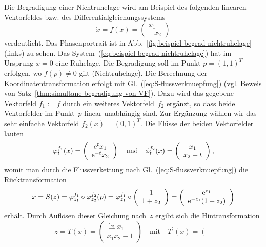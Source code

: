 \begin{example}
Die Begradigung einer Nichtruhelage wird am Beispiel des folgenden
linearen Vektorfeldes bzw. des Differentialgleichungssystems 
\begin{equation}
\dot{x}=f(x)=\left(\begin{array}{r}
x_{1}\\
-x_{2}
\end{array}\right)\label{eq:beispiel-begrad-nichtruhelage}
\end{equation}
verdeutlicht. Das Phasenportrait ist in Abb.~\ref{fig:beispiel-begrad-nichtruhelage}
(links) zu sehen. Das System~(\ref{eq:beispiel-begrad-nichtruhelage})
hat im Ursprung $x=0$ eine Ruhelage. Die Begradigung soll im Punkt
$p=(1,1)^{T}$ erfolgen, wo $f(p)\neq0$ gilt (Nichtruhelage). Die
Berechnung der Koordinatentransformation erfolgt mit Gl.~(\ref{eq:S-flussverknuepfung})
(vgl. Beweis von Satz~\ref{thm:simultane-begradigung-von-VF}). Dazu
wird das gegebene Vektorfeld $f_{1}:=f$ durch ein weiteres Vektorfeld~$f_{2}$
ergänzt, so dass beide Vektorfelder im Punkt~$p$ linear unabhängig
sind. Zur Ergänzung wählen wir das sehr einfache Vektorfeld $f_{2}(x)=(0,1)^{T}$.
Die Flüsse der beiden Vektorfelder lauten 
\[
\varphi_{t}^{f_{1}}(x)=\left(\begin{array}{c}
{\mathrm{e}}^{t}x_{1}\\
{\mathrm{e}}^{-t}x_{2}
\end{array}\right)\quad\text{und}\quad\phi_{t}^{f_{2}}(x)=\left(\begin{array}{c}
x_{1}\\
x_{2}+t
\end{array}\right),
\]
womit man durch die Flussverkettung nach Gl.~(\ref{eq:S-flussverknuepfung})
die Rücktransformation
\[
x=S(z)=\varphi_{z_{1}}^{f_{1}}\circ\varphi_{z_{2}}^{f_{2}}(p)=\varphi_{z_{1}}^{f_{1}}\circ\left(\begin{array}{c}
1\\
1+z_{2}
\end{array}\right)=\left(\begin{array}{c}
{\mathrm{e}}^{z_{1}}\\
{\mathrm{e}}^{-z_{1}}(1+z_{2})
\end{array}\right)
\]
erhält. Durch Auflösen dieser Gleichung nach~$z$ ergibt sich die
Hintransformation 
\begin{equation}
z=T(x)=\left(\begin{array}{c}
\ln x_{1}\\
x_{1}x_{2}-1
\end{array}\right)\quad\text{mit}\quad T^{\prime}(x)=\left(\begin{array}{cc}

\end{array}
\end{equation}
\end{example}
